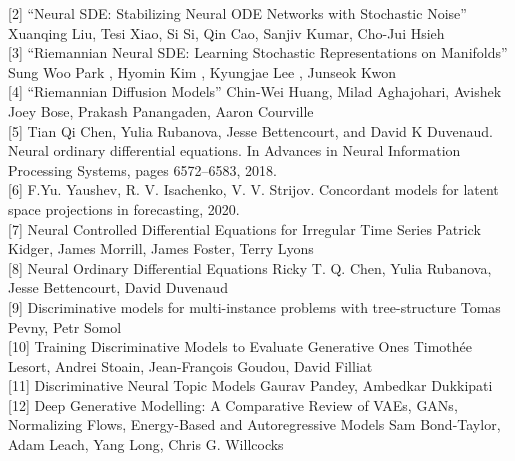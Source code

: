 \documentclass{article}
\begin{document}
[2] “Neural SDE: Stabilizing Neural ODE Networks with Stochastic Noise” Xuanqing Liu, Tesi Xiao, Si Si, Qin Cao, Sanjiv Kumar, Cho-Jui Hsieh  \\

[3] “Riemannian Neural SDE: Learning Stochastic Representations on Manifolds” Sung Woo Park , Hyomin Kim , Kyungjae Lee , Junseok Kwon \\

[4] “Riemannian Diffusion Models” Chin-Wei Huang, Milad Aghajohari, Avishek Joey Bose, Prakash Panangaden, Aaron Courville \\

[5] Tian Qi Chen, Yulia Rubanova, Jesse Bettencourt, and David K Duvenaud. Neural ordinary differential equations. In Advances in Neural Information Processing Systems, pages 6572–6583, 2018. \\

[6] F.Yu. Yaushev, R. V. Isachenko, V. V. Strijov. Concordant models for latent space projections in forecasting, 2020. \\

[7] Neural Controlled Differential Equations for Irregular Time Series
Patrick Kidger, James Morrill, James Foster, Terry Lyons \\

[8] Neural Ordinary Differential Equations
Ricky T. Q. Chen, Yulia Rubanova, Jesse Bettencourt, David Duvenaud \\

[9] Discriminative models for multi-instance problems with tree-structure
Tomas Pevny, Petr Somol \\

[10] Training Discriminative Models to Evaluate Generative Ones
Timothée Lesort, Andrei Stoain, Jean-François Goudou, David Filliat \\

[11] Discriminative Neural Topic Models
Gaurav Pandey, Ambedkar Dukkipati \\

[12] Deep Generative Modelling: A Comparative Review of VAEs, GANs, Normalizing Flows, Energy-Based and Autoregressive Models
Sam Bond-Taylor, Adam Leach, Yang Long, Chris G. Willcocks \\
\end{document}
